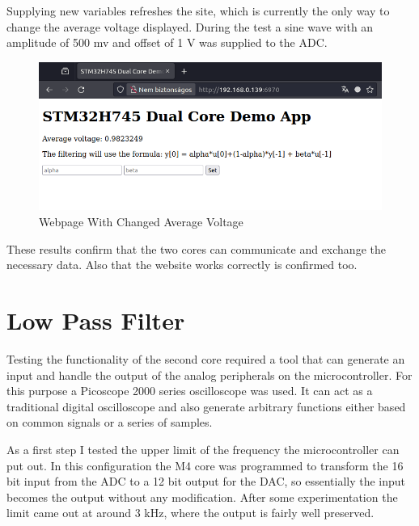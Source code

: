 Supplying new variables refreshes the site, which is currently the only way to change the average voltage displayed. During the test a sine wave with an amplitude of 500 mv and offset of 1 V was supplied to the ADC.

\begin{figure}[H]
    \centering
    \includegraphics[width=150mm, keepaspectratio]{figures/webpage-test2.png}
    \caption{Webpage With Changed Average Voltage}
    \label{fig:webpage-test2}
\end{figure}

These results confirm that the two cores can communicate and exchange the necessary data. Also that the website works correctly is confirmed too.

\section{Low Pass Filter}

Testing the functionality of the second core required a tool that can generate an input and handle the output of the analog peripherals on the microcontroller. For this purpose a Picoscope 2000 series oscilloscope was used. It can act as a traditional digital oscilloscope and also generate arbitrary functions either based on common signals or a series of samples.

As a first step I tested the upper limit of the frequency the microcontroller can put out. In this configuration the M4 core was programmed to transform the 16 bit input from the ADC to a 12 bit output for the DAC, so essentially the input becomes the output without any modification. After some experimentation the limit came out at around 3 kHz, where the output is fairly well preserved.

